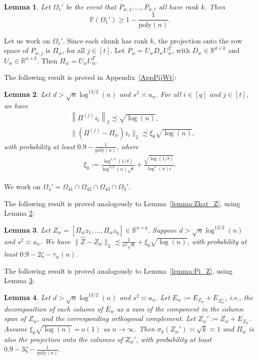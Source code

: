 \documentclass{article}
\newtheorem{lemma}{Lemma}
\newcommand{\mprob}{\mathbb{P}}
\begin{document}
\begin{lemma}
\label{lemma:hp_all_types_weight}
Let $\Omega_1'$ be the event that $P_{w, 1}, \dots, P_{w, t}$ all have rank $k$. Then
\begin{equation*}
\mprob(\Omega_1') \ge 1 - \frac{1}{\mathrm{poly}(n)}.
\end{equation*}
\end{lemma}

Let us work on $\Omega_1'$. Since each chunk has rank $k$, the projection onto the row space of $P_{w, j}$ is $\Pi_w$, for all $j \in [t]$. Let $P_w = U_wD_wU_w^T$, with $D_w \in \mathbb{R}^{k \times k}$ and $U_w \in \mathbb{R}^{n \times k}$. Then $\Pi_w = U_wU_w^T$.

The following result is proved in Appendix~\ref{AppPijWt}:

\begin{lemma}
\label{lemma:Pi^j-Pi_weight}
Let $d > \sqrt{n}\log^{13/2}(n)$ and $s^2 \asymp a_n$. For all $i \in [q]$ and $j \in [t]$, we have
\begin{align*}
&\left\|\Pi^{(j)}z_i\right\|_2 \precsim \sqrt{\log(n)},\\
&\|(\Pi^{(j)} - \Pi_w)z_i\|_2 \precsim \xi_0\sqrt{\log(n)},
\end{align*}
with probability at least $0.9 - \frac{1}{\mathrm{poly}(n)}$, where 
\begin{align*}
\xi_0 := \frac{\log^{1/4}(1/\delta)}{\log^{5/2}(n)\sqrt{\epsilon}} + \frac{\sqrt{\log(1/\delta)}}{\log^5(n)\epsilon}.
\end{align*}
\end{lemma}

We work on $\Omega_4' = \Omega_{41} \cap \Omega_{42} \cap \Omega_{43} \cap \Omega_3'$.

The following result is proved analogously to Lemma~\ref{lemma:Zhat_Z}, using Lemma \ref{lemma:Pi^j-Pi_weight}:

\begin{lemma}
\label{lemma:Zhat_Z_weighted}
Let $Z_w = [\Pi_w z_1, \dots, \Pi_w z_q] \in \mathbb{R}^{n \times q}$. Suppose $d > \sqrt{n}\log^{13/2}(n)$ and $s^2 \asymp a_n$. We have $\|\hat{Z} - Z_w\|_2 \precsim \frac{1}{n^2\sqrt{n}} + \xi_0\sqrt{\log(n)}$, with probability at least $0.9 - 2\zeta - \tau_w(n)$.
\end{lemma}

The following result is proved analogously to Lemma~\ref{lemma:Pi_Z}, using Lemma \ref{lemma:Zhat_Z_weighted}:

\begin{lemma}
\label{lemma:Pi_Z_weighted}
Let $d > \sqrt{n}\log^{13/2}(n)$ and $s^2 \asymp a_n$. Let $E_w := E_{Z_w} + E_{Z_w^{\perp}}$, i.e., the decomposition of each column of $E_w$ as a sum of the component in the column span of $Z_w$, and the corresponding orthogonal complement. Let $Z_w' := Z_w + E_{Z_w}$. Assume $\xi_0\sqrt{\log(n)} = o(1)$ as $n \rightarrow \infty$. Then $\sigma_k(Z_w') \asymp \sqrt{k} \asymp 1$ and $\Pi_w$ is also the projection onto the columns of $Z_w'$, with probability at least $0.9 - 3\zeta - \frac{1}{\mathrm{poly}(n)}$.
\end{lemma}
\end{document}
